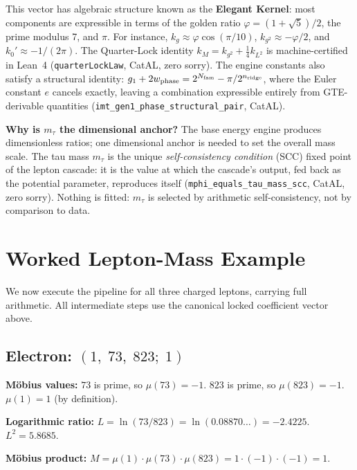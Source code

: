\documentclass[11pt,a4paper]{article}
\newcommand{\term}[1]{\textbf{#1}}
\newcommand{\lean}[1]{\texttt{#1}}
\newcommand{\CatAL}{\textsf{CatAL}}
\begin{document}
This vector has algebraic structure known as the \term{Elegant Kernel}: most
components are expressible in terms of the golden ratio
$\varphi = (1+\sqrt{5})/2$, the prime modulus 7, and $\pi$.  For instance,
$k_g \approx \varphi\cos(\pi/10)$, $k_{g^2} \approx -\varphi/2$, and
$k_0' \approx -1/(2\pi)$.  The Quarter-Lock identity
$k_M = k_{g^2} + \tfrac{1}{4}k_{L^2}$ is machine-certified in Lean~4
(\lean{quarterLockLaw}, \CatAL, zero sorry).
The engine constants also satisfy a structural identity:
$g_1 + 2w_{\rm phase} = 2^{N_{\rm fam}} - \pi/2^{n_{\rm ridge}}$, where
the Euler constant $e$ cancels exactly, leaving a combination expressible
entirely from GTE-derivable quantities (\lean{imt\_gen1\_phase\_structural\_pair}, \CatAL).

\medskip
\noindent\textbf{Why is $m_\tau$ the dimensional anchor?}\enspace
The base energy engine produces dimensionless ratios; one dimensional anchor is
needed to set the overall mass scale.  The tau mass $m_\tau$ is the unique
\emph{self-consistency condition} (SCC) fixed point of the lepton cascade: it is
the value at which the cascade's output, fed back as the potential parameter,
reproduces itself
(\lean{mphi\_equals\_tau\_mass\_scc}, \CatAL, zero sorry).
Nothing is fitted: $m_\tau$ is selected by arithmetic self-consistency, not by
comparison to data.

\section{Worked Lepton-Mass Example}
\label{sec:worked}

We now execute the pipeline for all three charged leptons, carrying full arithmetic.
All intermediate steps use the canonical locked coefficient vector above.

\subsection{Electron: $(1,\;73,\;823;\;1)$}

\textbf{M\"{o}bius values:}
$73$ is prime, so $\mu(73) = -1$.
$823$ is prime, so $\mu(823) = -1$.
$\mu(1) = 1$ (by definition).

\textbf{Logarithmic ratio:}
$L = \ln(73/823) = \ln(0.08870\ldots) = -2.4225$.  $L^2 = 5.8685$.

\textbf{M\"{o}bius product:}
$M = \mu(1)\cdot\mu(73)\cdot\mu(823) = 1\cdot(-1)\cdot(-1) = 1$.
\end{document}
